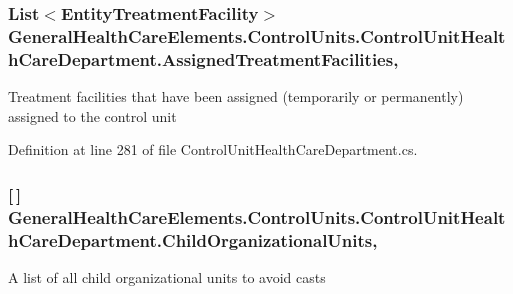 \subsubsection[{\texorpdfstring{Assigned\+Treatment\+Facilities}{AssignedTreatmentFacilities}}]{\setlength{\rightskip}{0pt plus 5cm}List$<${\bf Entity\+Treatment\+Facility}$>$ General\+Health\+Care\+Elements.\+Control\+Units.\+Control\+Unit\+Health\+Care\+Department.\+Assigned\+Treatment\+Facilities\hspace{0.3cm}{\ttfamily [get]}, {\ttfamily [set]}}\hypertarget{class_general_health_care_elements_1_1_control_units_1_1_control_unit_health_care_department_a3243b7bd3532fe00a73472270e86c15b}{}\label{class_general_health_care_elements_1_1_control_units_1_1_control_unit_health_care_department_a3243b7bd3532fe00a73472270e86c15b}


Treatment facilities that have been assigned (temporarily or permanently) assigned to the control unit 



Definition at line 281 of file Control\+Unit\+Health\+Care\+Department.\+cs.

\subsubsection[{\texorpdfstring{Child\+Organizational\+Units}{ChildOrganizationalUnits}}]{ \mbox{[}$\,$\mbox{]} General\+Health\+Care\+Elements.\+Control\+Units.\+Control\+Unit\+Health\+Care\+Department.\+Child\+Organizational\+Units\hspace{0.3cm}{\ttfamily [get]}, {\ttfamily [set]}}\hypertarget{class_general_health_care_elements_1_1_control_units_1_1_control_unit_health_care_department_a0ec2914069884d10f217bef7fcb4738e}{}\label{class_general_health_care_elements_1_1_control_units_1_1_control_unit_health_care_department_a0ec2914069884d10f217bef7fcb4738e}


A list of all child organizational units to avoid casts 



